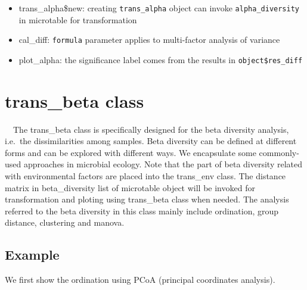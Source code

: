 \documentclass[
]{book}
\newenvironment{Shaded}{\begin{snugshade}}{\end{snugshade}}
\newcommand{\AttributeTok}[1]{\textcolor[rgb]{0.77,0.63,0.00}{#1}}
\newcommand{\CommentTok}[1]{\textcolor[rgb]{0.56,0.35,0.01}{\textit{#1}}}
\newcommand{\FunctionTok}[1]{\textcolor[rgb]{0.00,0.00,0.00}{#1}}
\newcommand{\NormalTok}[1]{#1}
\newcommand{\OtherTok}[1]{\textcolor[rgb]{0.56,0.35,0.01}{#1}}
\newcommand{\SpecialCharTok}[1]{\textcolor[rgb]{0.00,0.00,0.00}{#1}}
\newcommand{\StringTok}[1]{\textcolor[rgb]{0.31,0.60,0.02}{#1}}
\providecommand{\tightlist}{%
  \setlength{\itemsep}{0pt}\setlength{\parskip}{0pt}}
\begin{document}
\begin{itemize}
\tightlist
\item
  trans\_alpha\$new: creating \texttt{trans\_alpha} object can invoke \texttt{alpha\_diversity} in microtable for transformation
\item
  cal\_diff: \texttt{formula} parameter applies to multi-factor analysis of variance
\item
  plot\_alpha: the significance label comes from the results in \texttt{object\$res\_diff}
\end{itemize}

\hypertarget{trans_beta-class}{%
\section{trans\_beta class}\label{trans_beta-class}}

　The trans\_beta class is specifically designed for the beta diversity analysis, i.e.~the dissimilarities among samples.
Beta diversity can be defined at different forms\citep{Tuomisto_diversity_2010} and can be explored with different ways\citep{Anderson_Navigating_2011}.
We encapsulate some commonly-used approaches in microbial ecology\citep{Ramette_Multivariate_2007}.
Note that the part of beta diversity related with environmental factors are placed into the trans\_env class.
The distance matrix in beta\_diversity list of microtable object will be invoked for transformation and ploting using trans\_beta class when needed.
The analysis referred to the beta diversity in this class mainly include ordination, group distance, clustering and manova.

\hypertarget{example-3}{%
\subsection{Example}\label{example-3}}

We first show the ordination using PCoA (principal coordinates analysis).

\begin{Shaded}
\end{Shaded}
\end{document}
